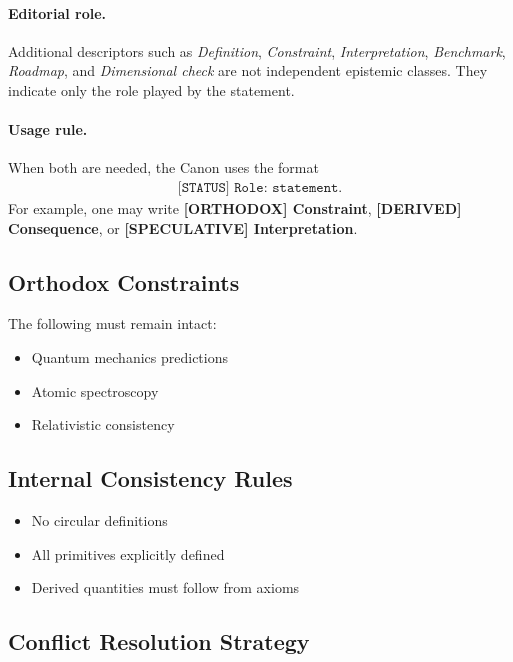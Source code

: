 \documentclass[11pt]{article}
\theoremstyle{definition}
\theoremstyle{plain}
\theoremstyle{remark}
\begin{document}
        \paragraph{Editorial role.}
        Additional descriptors such as \emph{Definition}, \emph{Constraint}, \emph{Interpretation}, \emph{Benchmark}, \emph{Roadmap}, and \emph{Dimensional check} are not independent epistemic classes. They indicate only the role played by the statement.

        \paragraph{Usage rule.}
        When both are needed, the Canon uses the format
        \begin{align}
            \texttt{[STATUS] Role: statement.}
        \end{align}
        For example, one may write \textbf{[ORTHODOX] Constraint}, \textbf{[DERIVED] Consequence}, or \textbf{[SPECULATIVE] Interpretation}.
    
    \subsection{Orthodox Constraints}
        
        The following must remain intact:
        
        \begin{itemize}
            \item Quantum mechanics predictions
            \item Atomic spectroscopy
            \item Relativistic consistency
        \end{itemize}
    
    \subsection{Internal Consistency Rules}
        
        \begin{itemize}
            \item No circular definitions
            \item All primitives explicitly defined
            \item Derived quantities must follow from axioms
        \end{itemize}
    
    \subsection{Conflict Resolution Strategy}
        
\end{document}
